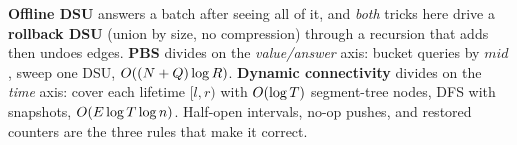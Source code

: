 \begin{recallbox}
\textbf{Offline DSU} answers a batch after seeing all of it, and \emph{both}
tricks here drive a \textbf{rollback DSU} (union by size, no compression)
through a recursion that adds then undoes edges.  \textbf{PBS} divides on the
\emph{value/answer} axis: bucket queries by \(\mathit{mid}\), sweep one DSU,
\(O((N+Q)\log R)\).  \textbf{Dynamic connectivity} divides on the \emph{time}
axis: cover each lifetime \([l,r)\) with \(O(\log T)\) segment-tree nodes, DFS
with snapshots, \(O(E\log T\log n)\).  Half-open intervals, no-op pushes, and
restored counters are the three rules that make it correct.
\end{recallbox}
